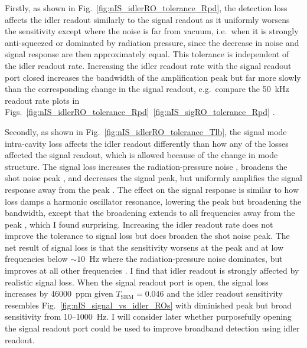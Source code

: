 Firstly, as shown in Fig.~\ref{fig:nIS_idlerRO_tolerance_Rpd}, the detection loss affects the idler readout similarly to the signal readout as it uniformly worsens the sensitivity except where the noise is far from vacuum, i.e.\ when it is strongly anti-squeezed or dominated by radiation pressure, since the decrease in noise and signal response are then approximately equal. This tolerance is independent of the idler readout rate. Increasing the idler readout rate with the signal readout port closed increases the bandwidth of the amplification peak but far more slowly than the corresponding change in the signal readout, e.g.\ compare the 50~kHz readout rate plots in Figs.~\ref{fig:nIS_idlerRO_tolerance_Rpd}~\ref{fig:nIS_sigRO_tolerance_Rpd} . %

Secondly, as shown in Fig.~\ref{fig:nIS_idlerRO_tolerance_Tlb}, the signal mode intra-cavity loss affects the idler readout differently than how any of the losses affected the signal readout, which is allowed because of the change in mode structure. The signal loss increases the radiation-pressure noise , broadens the shot noise peak , and decreases the signal peak, but uniformly amplifies the signal response away from the peak . The effect on the signal response is similar to how loss damps a harmonic oscillator resonance, lowering the peak but broadening the bandwidth, except that the broadening extends to all frequencies away from the peak , which I found surprising. Increasing the idler readout rate does not improve the tolerance to signal loss but does broaden the shot noise peak. The net result of signal loss is that the sensitivity worsens at the peak and at low frequencies below $\sim10$~Hz where the radiation-pressure noise dominates, but improves at all other frequencies . I find that idler readout is strongly affected by realistic signal loss. When the signal readout port is open, the signal loss increases by 46000~ppm given $T_\text{SRM}=0.046$ and the idler readout sensitivity resembles Fig.~\ref{fig:nIS_signal_vs_idler_ROs} with diminished peak but broad sensitivity from 10--1000~Hz. I will consider later whether purposefully opening the signal readout port could be used to improve broadband detection using idler readout. %

